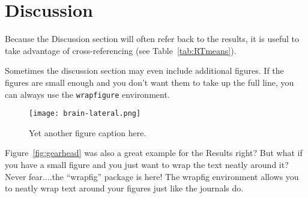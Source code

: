 \section{Discussion}
Because the Discussion section will often refer back to the results, it is useful to take advantage of cross-referencing (see Table~\ref{tab:RTmeans}). 

Sometimes the discussion section may even include additional figures.  If the figures are small enough and you don't want them to take up the full line, you can always use the \texttt{wrapfigure} environment.

\begin{wrapfigure}{l}{0.4\textwidth}     \centering       
\texttt{[image: brain-lateral.png]}
\caption{\label{fig:latbrain} Yet another figure caption here.}
\end{wrapfigure}

Figure~\ref{fig:gearhead} was also a great example for the Results right? But what if you have a small figure and you just want to wrap the text neatly around it?  Never fear....the ``wrapfig'' package is here! The wrapfig environment allows you to neatly wrap text around your figures just like the journals do. \blindtext
